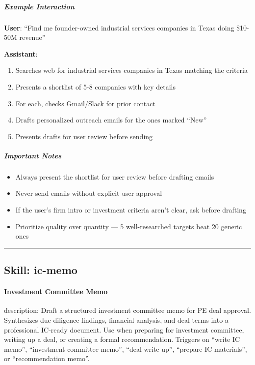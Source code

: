 \documentclass[11pt]{article}
\begin{document}
\subparagraph{Example Interaction}\mbox{}\par

\textbf{User}: ``Find me founder-owned industrial services companies in Texas doing \$10-50M revenue''


\textbf{Assistant}:

\begin{enumerate}[leftmargin=*,itemsep=2pt,topsep=2pt]
\item {} Searches web for industrial services companies in Texas matching the criteria
\item {} Presents a shortlist of 5-8 companies with key details
\item {} For each, checks Gmail/Slack for prior contact
\item {} Drafts personalized outreach emails for the ones marked ``New''
\item {} Presents drafts for user review before sending
\end{enumerate}

\subparagraph{Important Notes}\mbox{}\par

\begin{itemize}[leftmargin=*,itemsep=2pt,topsep=2pt]
\item {} Always present the shortlist for user review before drafting emails
\item {} Never send emails without explicit user approval
\item {} If the user's firm intro or investment criteria aren't clear, ask before drafting
\item {} Prioritize quality over quantity — 5 well-researched targets beat 20 generic ones
\end{itemize}

\vspace{0.8em}\hrule\vspace{0.8em}

\subsection{Skill: ic-memo}\label{file:skills-ic-memo-SKILL.md}

\paragraph{Investment Committee Memo}\mbox{}\par

description: Draft a structured investment committee memo for PE deal approval. Synthesizes due diligence findings, financial analysis, and deal terms into a professional IC-ready document. Use when preparing for investment committee, writing up a deal, or creating a formal recommendation. Triggers on ``write IC memo'', ``investment committee memo'', ``deal write-up'', ``prepare IC materials'', or ``recommendation memo''.
\end{document}
